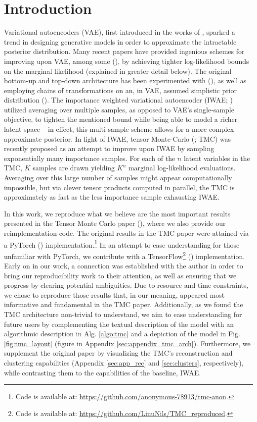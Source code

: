 \section{Introduction}
Variational autoencoders (VAE), first introduced in the works of \cite{kingma2013autoencoding}, sparked a trend in designing generative models in order to approximate the intractable posterior distribution. Many recent papers have provided ingenious schemes for improving upon VAE, among some (\cite{iwae, rezende2015variational, ladder, kingma2018glow}), by achieving tighter log-likelihood bounds on the marginal likelihood (explained in greater detail below). The original bottom-up and top-down architecture has been experimented with (\cite{ladder}), as well as employing chains of transformations on an, in VAE, assumed simplistic prior distribution (\cite{rezende2015variational, kingma2018glow}). The importance weighted variational autoencoder (IWAE; \cite{iwae}) utilized averaging over multiple samples, as opposed to VAE's single-sample objective, to tighten the mentioned bound while being able to model a richer latent space – in effect, this multi-sample scheme allows for a more complex approximate posterior. In light of IWAE, tensor Monte-Carlo (\cite{tmc}; TMC) was recently proposed as an attempt to improve upon IWAE by sampling exponentially many importance samples. For each of the $n$ latent variables in the TMC, $K$ samples are drawn yielding $K^n$ marginal log-likelihood evaluations. Averaging over this large number of samples might appear computationally impossible, but via clever tensor products computed in parallel, the TMC is approximately as fast as the less importance sample exhausting IWAE. 

In this work, we reproduce what we believe are the most important results presented in the Tensor Monte Carlo paper (\cite{tmc}), where we also provide our reimplementation code. The original results in the TMC paper were attained via a PyTorch (\cite{pytorch}) implementation.\footnote{Code is available at:   \url{https://github.com/anonymous-78913/tmc-anon}.} In an attempt to ease understanding for those unfamiliar with PyTorch, we contribute with a TensorFlow\footnote{Code is available at:
\url{https://github.com/LinuNils/TMC_reproduced}.} (\cite{tensorflow}) implementation. Early on in our work, a connection was established with the author in order to bring our reproducibility work to their attention, as well as ensuring that we progress by clearing potential ambiguities. Due to resource and time constraints, we chose to reproduce those results that, in our meaning, appeared most informative and fundamental in the TMC paper. Additionally, as we found the TMC architecture non-trivial to understand, we aim to ease understanding for future users by complementing the textual description of the model with an algorithmic description in Alg. \ref{algo:tmc} and a depiction of the model in Fig. \ref{fig:tmc_layout} (figure in Appendix \ref{sec:appendix_tmc_arch}). Furthermore, we supplement the original paper by visualizing the TMC's reconstruction and clustering capabilities (Appendix \ref{sec:app_rec} and \ref{sec:clusters}, respectively), while contrasting them to the capabilities of the baseline, IWAE.

